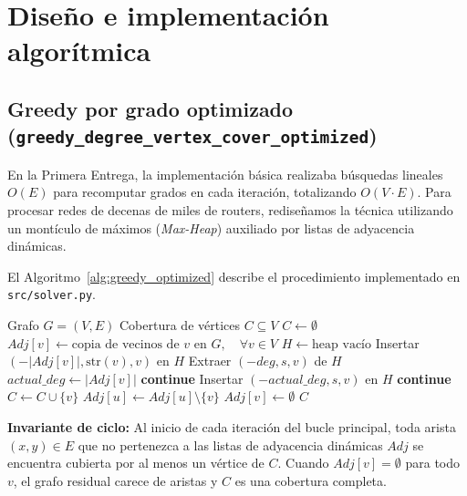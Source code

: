 \documentclass[11pt,a4paper]{article}
\begin{document}
\section{Diseño e implementación algorítmica}
\label{sec:diseno-algoritmico}

\subsection{Greedy por grado optimizado (\texttt{greedy\_degree\_vertex\_cover\_optimized})}
En la Primera Entrega, la implementación básica realizaba búsquedas lineales $O(E)$ para recomputar grados en cada iteración, totalizando $O(V \cdot E)$. Para procesar redes de decenas de miles de routers, rediseñamos la técnica utilizando un montículo de máximos (\textit{Max-Heap}) auxiliado por listas de adyacencia dinámicas.

El Algoritmo~\ref{alg:greedy_optimized} describe el procedimiento implementado en \texttt{src/solver.py}.

\begin{algorithm}[H]
\caption{Greedy por Grado Optimizado con Lazy Max-Heap}
\label{alg:greedy_optimized}
\begin{algorithmic}[1]
\Require Grafo $G = (V, E)$
\Ensure Cobertura de vértices $C \subseteq V$
\State $C \gets \emptyset$
\State $Adj[v] \gets \text{copia de vecinos de } v \text{ en } G, \quad \forall v \in V$
\State $H \gets \text{heap vacío}$
	\State Insertar $(-|Adj[v]|, \text{str}(v), v)$ en $H$
\EndFor
{}
	\State Extraer $(-deg, s, v)$ de $H$ 
	\State $actual\_deg \gets |Adj[v]|$
		\State \textbf{continue} 
	\EndIf
	 
		\State Insertar $(-actual\_deg, s, v)$ en $H$
		\State \textbf{continue}
	\EndIf
	\State $C \gets C \cup \{v\}$
		\State $Adj[u] \gets Adj[u] \setminus \{v\}$
	\EndFor
	\State $Adj[v] \gets \emptyset$
\EndWhile
\State \Return $C$
\end{algorithmic}
\end{algorithm}

\textbf{Invariante de ciclo:} Al inicio de cada iteración del bucle principal, toda arista $(x, y) \in E$ que no pertenezca a las listas de adyacencia dinámicas $Adj$ se encuentra cubierta por al menos un vértice de $C$. Cuando $Adj[v] = \emptyset$ para todo $v$, el grafo residual carece de aristas y $C$ es una cobertura completa.
\end{document}
